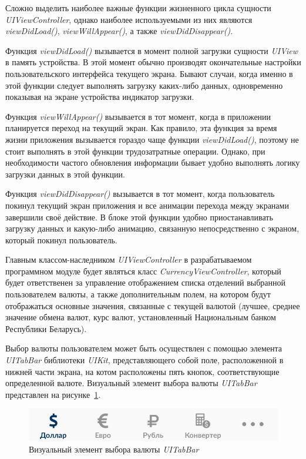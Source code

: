 Сложно выделить наиболее важные функции жизненного цикла сущности \textit{UIViewController},
однако наиболее используемыми из них являются \textit{viewDidLoad()},
\textit{viewWillAppear()}, а также \textit{viewDidDisappear()}.

Функция \textit{viewDidLoad()} вызывается в момент полной загрузки
сущности \textit{UIView} в память устройства. В этой момент обычно производят
окончательные настройки пользовательского интерфейса текущего экрана.
Бывают случаи, когда именно в этой функции следует выполнять загрузку каких-либо
данных, одновременно показывая на экране устройства индикатор загрузки.

Функция \textit{viewWillAppear()} вызывается в тот момент, когда в приложении
планируется переход на текущий экран. Как правило, эта функция за время жизни приложения
вызывается гораздо чаще функции \textit{viewDidLoad()}, поэтому не стоит выполнять
в этой функции трудозатратные операции. Однако, при необходимости частого
обновления информации бывает удобно выполнять логику загрузки данных в этой
функции.

Функция \textit{viewDidDisappear()} вызывается в тот момент, когда пользователь
покинул текущий экран приложения и все анимации перехода между экранами завершили
своё действие. В блоке этой функции удобно приостанавливать загрузку данных и
какую-либо анимацию, связанную непосредственно с экраном, который покинул
пользователь.

Главным классом-наследником \textit{UIViewController} в разрабатываемом программном
модуле будет являться класс \textit{CurrencyViewController}, который будет
ответственен за управление отображением списка отделений выбранной пользователем
валюты, а также дополнительным полем, на котором будут отображаться основные
значения, связанные с текущей валютой (лучшее, среднее значение обмена валют,
курс валют, установленный Национальным банком Республики Беларусь).

Выбор валюты пользователем может быть осуществлен с помощью элемента \textit{UITabBar}
библиотеки \textit{UIKit}, представляющего собой поле, расположенной в нижней
части экрана, на котом расположены пять кнопок, соответствующие определенной валюте.
Визуальный элемент выбора валюты \textit{UITabBar} представлен на
рисунке~\ref{fig:tabbar}.
\begin{figure}[h!]
  \centering
  \includegraphics[width=140mm]{fig/tabbar}
  \caption{Визуальный элемент выбора валюты \textit{UITabBar}}
  \label{fig:tabbar}
\end{figure}

